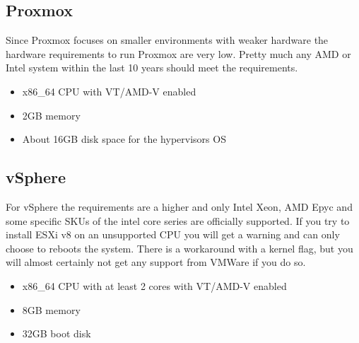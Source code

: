 \subsection{Proxmox}
Since Proxmox focuses on smaller environments with weaker hardware the hardware requirements to run Proxmox are very low. Pretty much any AMD or Intel system within the last 10 years should meet the requirements.

\begin{itemize}
	\item x86\_64 CPU with VT/AMD-V enabled
	\item 2GB memory
	\item About 16GB disk space for the hypervisors OS
\end{itemize}

\subsection{vSphere}
For vSphere the requirements are a higher and only Intel Xeon, AMD Epyc and some specific SKUs of the intel core series are officially supported. 
If you try to install ESXi v8 on an unsupported CPU you will get a warning and can only choose to reboots the system. There is a workaround with a kernel flag, but you will almost certainly not get any support from VMWare if you do so. 

\begin{itemize}
	\item x86\_64 CPU with at least 2 cores with VT/AMD-V enabled
	\item 8GB memory
	\item 32GB boot disk
\end{itemize}